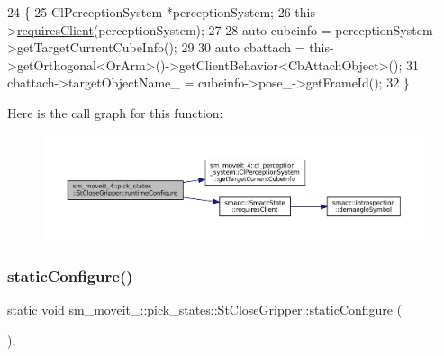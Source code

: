 \begin{DoxyCode}
24          \{
25             ClPerceptionSystem *perceptionSystem;
26             this->\hyperlink{classsmacc_1_1ISmaccState_a7f95c9f0a6ea2d6f18d1aec0519de4ac}{requiresClient}(perceptionSystem);
27 
28             \textcolor{keyword}{auto} cubeinfo = perceptionSystem->getTargetCurrentCubeInfo();
29 
30             \textcolor{keyword}{auto} cbattach = this->getOrthogonal<OrArm>()->getClientBehavior<CbAttachObject>();
31             cbattach->targetObjectName\_ = cubeinfo->pose\_->getFrameId();
32          \}
\end{DoxyCode}
Here is the call graph for this function\+:
\nopagebreak
\begin{figure}[H]
\begin{center}
\leavevmode
\includegraphics[width=350pt]{structsm__moveit__4_1_1pick__states_1_1StCloseGripper_af3be0f07cd47254137be3f0eb049e90f_cgraph}
\end{center}
\end{figure}
\mbox{\label{structsm__moveit__4_1_1pick__states_1_1StCloseGripper_a5076328fb91d79beac4b1910aee86b05}} 
\subsubsection{\texorpdfstring{static\+Configure()}{staticConfigure()}}
{\footnotesize\ttfamily static void sm\+\_\+moveit\+\_\+::pick\+\_\+states\+::\+St\+Close\+Gripper\+::static\+Configure (\begin{DoxyParamCaption}{ }\end{DoxyParamCaption})\hspace{0.3cm}{\ttfamily [inline]}, {\ttfamily [static]}}



